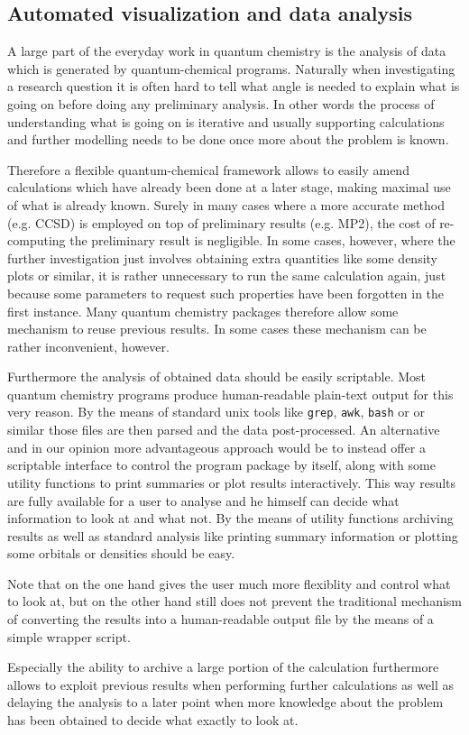 
\subsection{Automated visualization and data analysis}
A large part of the everyday work in quantum chemistry
is the analysis of data which is generated by quantum-chemical programs.
Naturally when investigating a research question it is often
hard to tell what angle is needed to explain what is going on
before doing any preliminary analysis.
In other words the process of understanding what is going on is iterative
and usually supporting calculations and further modelling
needs to be done once more about the problem is known.

Therefore a flexible quantum-chemical framework allows to
easily amend calculations which have already been done
at a later stage, making maximal use of what is already known.
Surely in many cases where a more accurate method (e.g. CCSD) is employed
on top of preliminary results (e.g. MP2),
the cost of re-computing the preliminary result is negligible.
In some cases, however,
where the further investigation just involves obtaining
extra quantities like some density plots or similar,
it is rather unnecessary to run the same calculation again,
just because some parameters to request such properties
have been forgotten in the first instance.
Many quantum chemistry packages therefore allow
some mechanism to reuse previous results.
In some cases these mechanism can be rather inconvenient, however.

Furthermore the analysis of obtained data should be easily scriptable.
Most quantum chemistry programs produce human-readable plain-text output
for this very reason.
By the means of standard unix tools like \texttt{grep}, \texttt{awk},
\texttt{bash} or \python or similar those files are then parsed and
the data post-processed.
An alternative and in our opinion more advantageous approach
would be to instead offer a scriptable interface to control
the program package by itself,
along with some utility functions to print summaries
or plot results interactively.
This way results are fully available for a user to analyse
and he himself can decide what information to look at
and what not.
By the means of utility functions
archiving results as well as standard analysis
like printing summary information or plotting some orbitals or densities
should be easy.

Note that on the one hand gives the user much more flexiblity and control
what to look at,
but on the other hand still does not prevent the traditional
mechanism of converting the results into a human-readable output file
by the means of a simple wrapper script.

Especially the ability to archive a large portion of the calculation
furthermore allows to exploit previous results when performing
further calculations as well as delaying the analysis
to a later point when \eg more knowledge about the
problem has been obtained to decide what exactly to look at.
